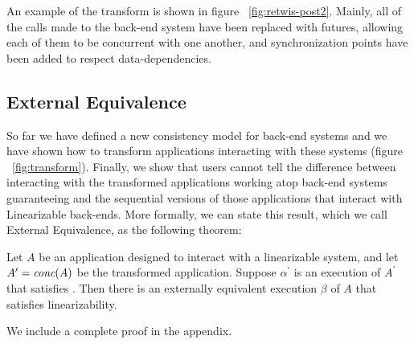 An example of the transform is shown in figure ~\ref{fig:retwis-post2}. Mainly, all of the calls made to the back-end system have been replaced with futures, allowing each of them to be concurrent with one another, and synchronization points have been added to respect data-dependencies.

\subsection{External Equivalence}
\label{sec:mdl:exteq}
So far we have defined a new consistency model for back-end systems and we have shown how to transform applications interacting with these systems (figure ~\ref{fig:transform}). Finally, we show that users cannot tell the difference between interacting with the transformed applications working atop back-end systems guaranteeing \mdl{} and the sequential versions of those applications that interact with Linearizable back-ends. More formally, we can state this result, which we call External Equivalence, as the following theorem:

\begin{thm}
Let $A$ be an application designed to interact with a linearizable system,
and let $A^\prime = \operatorname*{\textit{conc}}(A)$ be the transformed application. Suppose
$\alpha^\prime$ is an execution of $A^\prime$ that satisfies
\MDL{}. Then there is an externally equivalent execution $\beta$
of $A$ that satisfies linearizability.
\end{thm}


We include a complete proof in the appendix.




